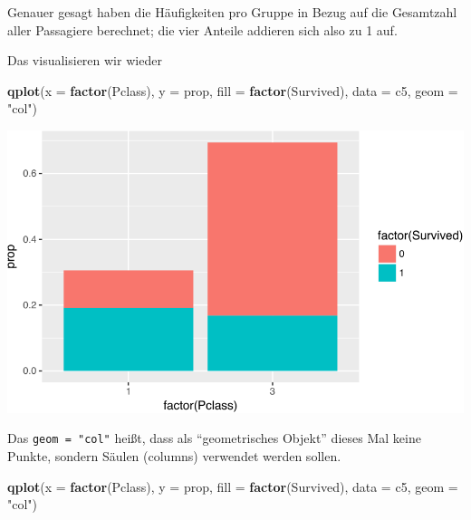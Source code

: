\documentclass[12pt,ngerman,]{book}
\newenvironment{Shaded}{\begin{snugshade}}{\end{snugshade}}
\newcommand{\KeywordTok}[1]{\textcolor[rgb]{0.13,0.29,0.53}{\textbf{{#1}}}}
\newcommand{\DataTypeTok}[1]{\textcolor[rgb]{0.13,0.29,0.53}{{#1}}}
\newcommand{\DecValTok}[1]{\textcolor[rgb]{0.00,0.00,0.81}{{#1}}}
\newcommand{\StringTok}[1]{\textcolor[rgb]{0.31,0.60,0.02}{{#1}}}
\newcommand{\CommentTok}[1]{\textcolor[rgb]{0.56,0.35,0.01}{\textit{{#1}}}}
\newcommand{\NormalTok}[1]{{#1}}
\renewenvironment{Shaded}{\begin{kframe}}{\end{kframe}}
\begin{document}
\begin{Shaded}
\end{Shaded}

Genauer gesagt haben die Häufigkeiten pro Gruppe in Bezug auf die
Gesamtzahl aller Passagiere berechnet; die vier Anteile addieren sich
also zu 1 auf.

Das visualisieren wir wieder

\begin{Shaded}
\begin{Highlighting}[]
\KeywordTok{qplot}\NormalTok{(}\DataTypeTok{x =} \KeywordTok{factor}\NormalTok{(Pclass), }\DataTypeTok{y =} \NormalTok{prop, }\DataTypeTok{fill =} \KeywordTok{factor}\NormalTok{(Survived), }\DataTypeTok{data =} \NormalTok{c5, }\DataTypeTok{geom =} \StringTok{"col"}\NormalTok{)}
\end{Highlighting}
\end{Shaded}

\begin{center}\includegraphics[width=0.7\linewidth]{075_Fallstudie_Titanic_files/figure-latex/unnamed-chunk-11-1} \end{center}

Das \texttt{geom\ =\ "col"} heißt, dass als ``geometrisches Objekt''
dieses Mal keine Punkte, sondern Säulen (columns) verwendet werden
sollen.

\begin{Shaded}
\begin{Highlighting}[]
\KeywordTok{qplot}\NormalTok{(}\DataTypeTok{x =} \KeywordTok{factor}\NormalTok{(Pclass), }\DataTypeTok{y =} \NormalTok{prop, }\DataTypeTok{fill =} \KeywordTok{factor}\NormalTok{(Survived), }\DataTypeTok{data =} \NormalTok{c5, }\DataTypeTok{geom =} \StringTok{"col"}\NormalTok{)}
\end{Highlighting}
\end{Shaded}
\end{document}
